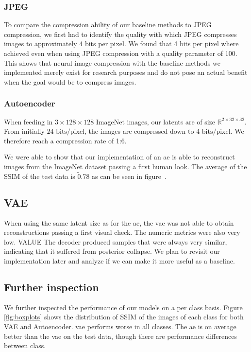 \subsubsection{JPEG}\label{subsubsec:jpeg}
To compare the compression ability of our baseline methods to JPEG compression, we first had to identify the quality with which JPEG compresses images to approximately 4 bits per pixel.
We found that 4 bits per pixel where achieved even when using JPEG compression with a quality parameter of 100.
This shows that neural image compression with the baseline methods we implemented merely exist for research purposes and do not pose an actual benefit when the goal would be to compress images.

\subsubsection{Autoencoder}\label{subsubsec:autoencoder}
When feeding in $3 \times 128 \times 128$ ImageNet images, our latents are of size $\mathbb{R}^{2\times 32 \times 32}$.
From initially $24\text{ bits/pixel}$, the images are compressed down to $4\text{ bits/pixel}$.
We therefore reach a compression rate of 1:6.

We were able to show that our implementation of an \ac{ae} is able to reconstruct images from the ImageNet dataset
passing a first human look.
The average of the SSIM of the test data is $\tilde0.78$ as can be seen in figure~\cite{citationNeeded}.

\subsection{VAE}
When using the same latent size as for the \ac{ae}, the \ac{vae} was not able to obtain reconstructions
passing a first visual check.
The numeric metrics were also very low. VALUE
The decoder produced samples that were always very similar, indicating that it suffered from posterior collapse.
We plan to revisit our implementation later and analyze if we can make it more useful as a baseline.

\subsection{Further inspection}
We further inspected the performance of our models on a per class basis. Figure \ref{fig:boxplots} shows the distribution of SSIM of the images of each class for both VAE and Autoencoder. \ac{vae} performs worse in all classes. The \ac{ae} is on average better than the \ac{vae} on the test data, though there are performance differences between class. 

